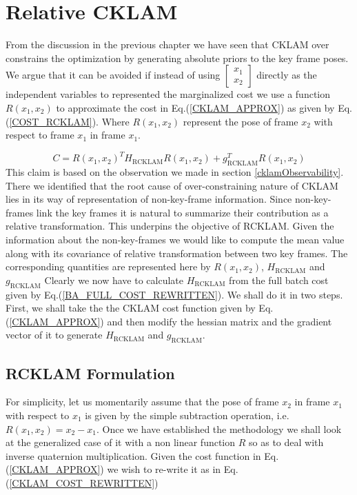 \chapter{Relative CKLAM}
\label{sec:RCKLAM}

From the discussion in the previous chapter we have seen that CKLAM over constrains the optimization by generating absolute priors to the key frame poses. We argue that it can be avoided if instead of using $\begin{bmatrix} x_{1} \\ x_{2} \end{bmatrix}$ directly as the independent variables to represented the marginalized cost we use a function $R(x_1, x_2)$ to approximate the cost in Eq.(\ref{CKLAM_APPROX}) as given by Eq.(\ref{COST_RCKLAM}). Where $R(x_1, x_2)$ represent the pose of frame $x_2$ with respect to frame $x_1$ in frame $x_1$. 

\begin{equation}
	C = R(x_1, x_2)^TH_\mathrm{RCKLAM}R(x_1, x_2) + g_\mathrm{RCKLAM}^TR(x_1, x_2)
	\label{COST_RCKLAM}
\end{equation}
This claim is based on the observation we made in section \ref{cklamObservability}. There we identified that the root cause of over-constraining nature of CKLAM lies in its way of representation of non-key-frame information. Since non-key-frames link the key frames it is natural to summarize their contribution as a relative transformation. This underpins the objective of RCKLAM. Given the information about the non-key-frames we would like to compute the mean value along with its covariance of relative transformation between two key frames. The corresponding quantities are represented here by $R(x_1, x_2)$, $H_\mathrm{RCKLAM}$ and $g_\mathrm{RCKLAM}$
Clearly we now have to calculate $H_\mathrm{RCKLAM}$ from the full batch cost given by Eq.(\ref{BA_FULL_COST_REWRITTEN}). We shall do it in two steps. First, we shall take the the CKLAM cost function given by Eq.(\ref{CKLAM_APPROX}) and then modify the hessian matrix and the gradient vector of it to generate $H_\mathrm{RCKLAM}$ and $g_\mathrm{RCKLAM}$.

\section{RCKLAM Formulation}
\label{rcklam_simple}
For simplicity, let us momentarily assume that the pose of frame $x_2$ in frame $x_1$ with respect to $x_1$ is given by the simple  subtraction operation, i.e. $R(x_1, x_2) = x_2 - x_1$. Once we have established the methodology we shall look at the generalized case of it with a non linear function $R$ so as to deal with inverse quaternion multiplication. Given the cost function in Eq.(\ref{CKLAM_APPROX}) we wish to re-write it as in Eq.(\ref{CKLAM_COST_REWRITTEN})

